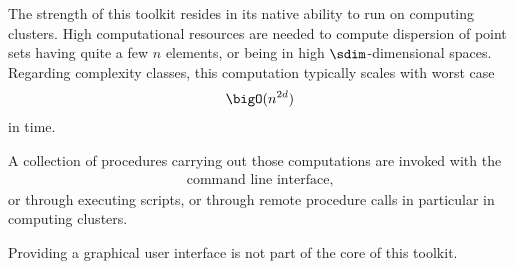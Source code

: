 %
The strength of this toolkit resides in its native ability to run on computing clusters. High computational resources are needed to compute dispersion of point sets having quite a few $n$ elements, or being in high $\sdim$-dimensional spaces. Regarding complexity classes, this computation typically scales with worst case
\begin{align*}
  \bigO(n^{2d})
\end{align*}
in time.

A collection of procedures carrying out those computations are invoked with the
\begin{align*}
  \text{command line interface,}
\end{align*}
or through executing scripts, or through remote procedure calls in particular in computing clusters.

Providing a graphical user interface is not part of the core of this toolkit.
